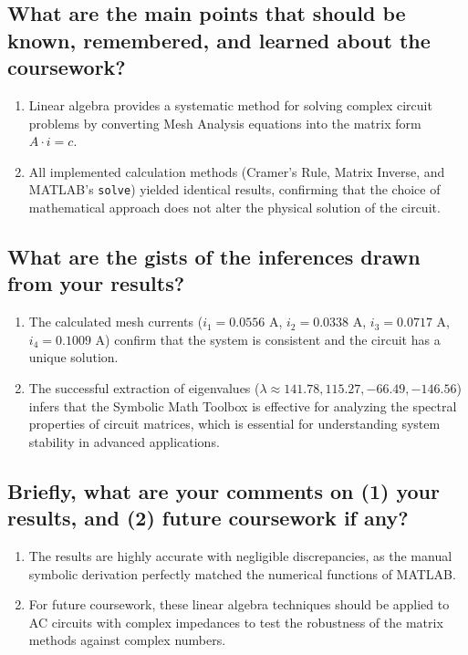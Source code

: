 \subsection{What are the main points that should be known, remembered, and learned about the coursework?}
\begin{enumerate}
\item Linear algebra provides a systematic method for solving complex circuit problems by converting Mesh Analysis equations into the matrix form $A\cdot i = c$.
\item All implemented calculation methods (Cramer's Rule, Matrix Inverse, and MATLAB's \texttt{solve}) yielded identical results, confirming that the choice of mathematical approach does not alter the physical solution of the circuit.
\end{enumerate}

\subsection{What are the gists of the inferences drawn from your results?}
\begin{enumerate}
\item The calculated mesh currents ($i_1=0.0556$ A, $i_2=0.0338$ A, $i_3=0.0717$ A, $i_4=0.1009$ A) confirm that the system is consistent and the circuit has a unique solution.
\item The successful extraction of eigenvalues ($\lambda \approx 141.78, 115.27, -66.49, -146.56$) infers that the Symbolic Math Toolbox is effective for analyzing the spectral properties of circuit matrices, which is essential for understanding system stability in advanced applications.
\end{enumerate}

\subsection{Briefly, what are your comments on (1) your results, and (2) future coursework if any?}
\begin{enumerate}
\item The results are highly accurate with negligible discrepancies, as the manual symbolic derivation perfectly matched the numerical functions of MATLAB.
\item For future coursework, these linear algebra techniques should be applied to AC circuits with complex impedances to test the robustness of the matrix methods against complex numbers.
\end{enumerate}